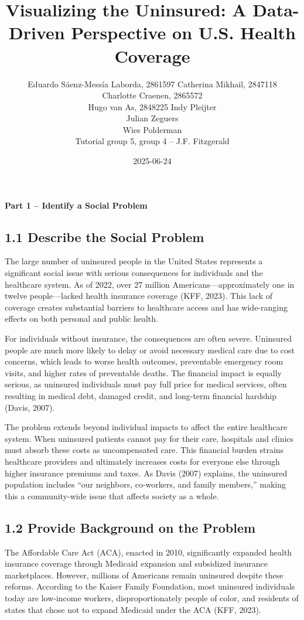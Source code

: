 \documentclass[
]{article}
\title{Visualizing the Uninsured: A Data-Driven Perspective on U.S.
Health Coverage}
\author{Eduardo Sáenz-Messía Laborda, 2861597 Catherina Mikhail,
2847118\\
Charlotte Craenen, 2865572\\
Hugo van As, 2848225 Indy Pleijter\\
Julian Zeguers\\
Wies Polderman\\
Tutorial group 5, group 4 -- J.F. Fitzgerald}
\date{2025-06-24}
\begin{document}
\maketitle

{
\setcounter{tocdepth}{2}
\tableofcontents
}
\textbf{Part 1 -- Identify a Social Problem}

\subsection{1.1 Describe the Social
Problem}\label{describe-the-social-problem}

The large number of uninsured people in the United States represents a
significant social issue with serious consequences for individuals and
the healthcare system. As of 2022, over 27 million
Americans---approximately one in twelve people---lacked health insurance
coverage (KFF, 2023). This lack of coverage creates substantial barriers
to healthcare access and has wide-ranging effects on both personal and
public health.

For individuals without insurance, the consequences are often severe.
Uninsured people are much more likely to delay or avoid necessary
medical care due to cost concerns, which leads to worse health outcomes,
preventable emergency room visits, and higher rates of preventable
deaths. The financial impact is equally serious, as uninsured
individuals must pay full price for medical services, often resulting in
medical debt, damaged credit, and long-term financial hardship (Davis,
2007).

The problem extends beyond individual impacts to affect the entire
healthcare system. When uninsured patients cannot pay for their care,
hospitals and clinics must absorb these costs as uncompensated care.
This financial burden strains healthcare providers and ultimately
increases costs for everyone else through higher insurance premiums and
taxes. As Davis (2007) explains, the uninsured population includes ``our
neighbors, co-workers, and family members,'' making this a
community-wide issue that affects society as a whole.

\subsection{1.2 Provide Background on the
Problem}\label{provide-background-on-the-problem}

The Affordable Care Act (ACA), enacted in 2010, significantly expanded
health insurance coverage through Medicaid expansion and subsidized
insurance marketplaces. However, millions of Americans remain uninsured
despite these reforms. According to the Kaiser Family Foundation, most
uninsured individuals today are low-income workers, disproportionately
people of color, and residents of states that chose not to expand
Medicaid under the ACA (KFF, 2023).
\end{document}
